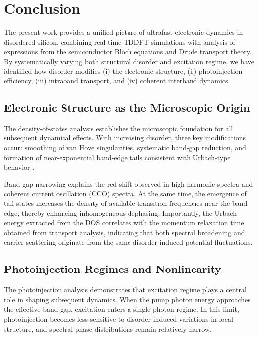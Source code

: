 \chapter{Conclusion}
\label{chap:discussion}

The present work provides a unified picture of ultrafast electronic dynamics in disordered silicon, combining real-time TDDFT simulations with analysis of expressions from the semiconductor Bloch equations and Drude transport theory. By systematically varying both structural disorder and excitation regime, we have identified how disorder modifies (i) the electronic structure, (ii) photoinjection efficiency, (iii) intraband transport, and (iv) coherent interband dynamics.

\section*{Electronic Structure as the Microscopic Origin}

The density-of-states analysis establishes the microscopic foundation for all subsequent dynamical effects. With increasing disorder, three key modifications occur: smoothing of van Hove singularities, systematic band-gap reduction, and formation of near-exponential band-edge tails consistent with Urbach-type behavior \cite{MottDavis1979,Urbach1953}. 

Band-gap narrowing explains the red shift observed in high-harmonic spectra and coherent current oscillation (CCO) spectra. At the same time, the emergence of tail states increases the density of available transition frequencies near the band edge, thereby enhancing inhomogeneous dephasing. Importantly, the Urbach energy extracted from the DOS correlates with the momentum relaxation time obtained from transport analysis, indicating that both spectral broadening and carrier scattering originate from the same disorder-induced potential fluctuations.

\section*{Photoinjection Regimes and Nonlinearity}

The photoinjection analysis demonstrates that excitation regime plays a central role in shaping subsequent dynamics. When the pump photon energy approaches the effective band gap, excitation enters a single-photon regime. In this limit, photoinjection becomes less sensitive to disorder-induced variations in local structure, and spectral phase distributions remain relatively narrow.

